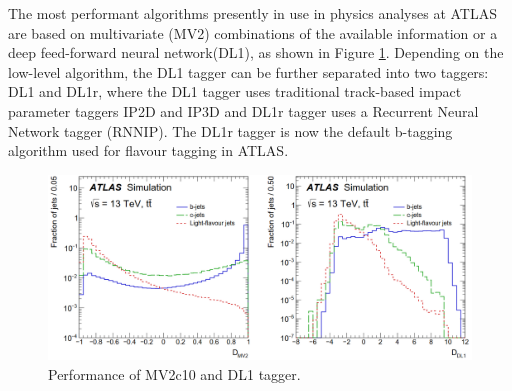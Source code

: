 \documentclass[letterpaper,12pt]{article}
\begin{document}
The most performant algorithms presently in use in physics 
analyses at ATLAS are based on multivariate (MV2) combinations 
of the available information or a deep feed-forward neural 
network(DL1)\cite{tagging}\cite{ATL-PHYS-PUB-2017-013}, as shown in 
Figure \ref{fig:MV2_DL1}. Depending on the low-level algorithm, 
the DL1 tagger can be further separated into two taggers: DL1 and DL1r,
 where the DL1 tagger uses traditional track-based impact parameter 
 taggers IP2D and IP3D and DL1r tagger uses a Recurrent Neural Network tagger 
 (RNNIP)\cite{ATL-PHYS-PUB-2017-013}. The DL1r tagger is now the 
 default b-tagging algorithm used for flavour tagging in ATLAS.
\begin{figure}
\includegraphics[width=1\textwidth]{MV2_DL1.png}
\caption{Performance of MV2c10 and DL1 tagger\cite{FTAG-2018-01}.}\label{fig:MV2_DL1}
\end{figure}
\end{document}

